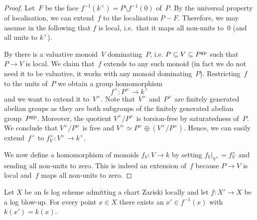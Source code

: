 \begin{proof}
    Let~$F$ be the face $f^{-1}(k^\times) = P \setminus f^{-1}(0)$ of~$P$.
    By the universal property of localisation, we can extend~$f$ to the localisation $P-F$.
    Therefore, we may assume in the following that $f$ is local, i.e.\ that it maps all non-units to~$0$ (and all units to $k^\times$).

    By \cite[Proposition~I.2.4.1]{Ogus} there is a valuative monoid~$V$ dominating~$P$, i.e. $P \subseteq V \subseteq P^{\rm gp}$ such that $P \to V$ is local.
    We claim that~$f$ extends to any such monoid (in fact we do not need it to be valuative, it works with any monoid dominating~$P$).
    Restricting~$f$ to the units of~$P$ we obtain a group homomorphism
    \[
        f^\times \colon P^\times \longrightarrow k^\times
    \]
    and we want to extend it to~$V^\times$.
    Note that~$V^\times$ and~$P^\times$ are finitely generated abelian groups as they are both subgroups of the finitely generated abelian group~$P^{\rm gp}$.
    Moreover, the quotient $V^\times/P^\times$ is torsion-free by saturatedness of~$P$.
    We conclude that $V^\times/P^\times$ is free and $V^\times \simeq P^\times \oplus (V^\times/P^\times)$.
    Hence, we can easily extend~$f^\times$ to $f_V^\times \colon V^\times \to k^\times$.

    We now define a homomorphism of monoids $f_V \colon V \to k$  by setting $f_V|_{V^\times} = f_V^\times$ and sending all non-units to zero.
    This is indeed an extension of~$f$ because $P \to V$ is local and~$f$ maps all non-units to zero.
\end{proof}

\begin{lem} \label{lem:log-blowup-fibres}
    Let $X$ be an fs log scheme admitting a chart Zariski locally and let $f\colon X'\to X$ be a log blow-up.
    For every point $x\in X$ there exists an $x'\in f^{-1}(x)$ with $k(x')=k(x)$.
\end{lem}


